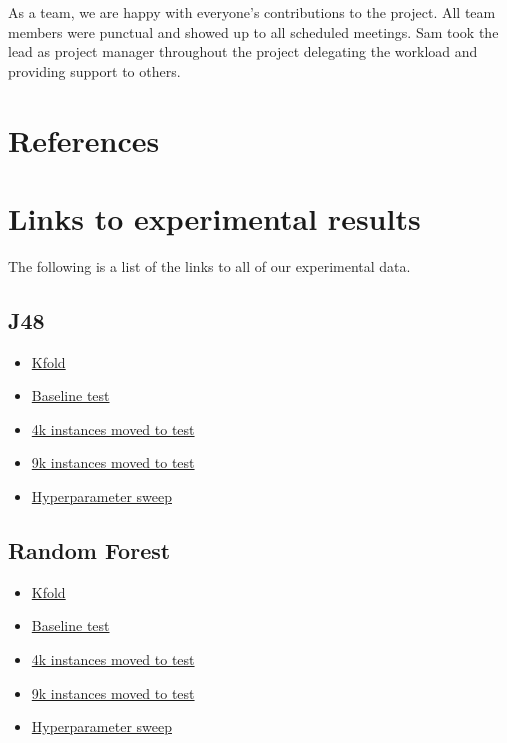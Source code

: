 \documentclass[11pt]{article}
\begin{document}
As a team, we are happy with everyone's contributions to the project. All team members were punctual and showed up to all scheduled meetings. Sam took the lead as project manager throughout the project delegating the workload and providing support to others.

\newpage
\section{References}
\printbibliography

\newpage
\section{Links to experimental results}
The following is a list of the links to all of our experimental data.

\subsection{J48}
\begin{itemize}
  \item \href{https://wandb.ai/supervisedlearning/J48%20all%20Kfolds/?workspace=user-jimmym620}{Kfold}
  \item \href{https://wandb.ai/supervisedlearning/J48%20all%20test%20set%20experiments?workspace=user-dardric}{Baseline test}
  \item \href{https://wandb.ai/supervisedlearning/J48%20all%204000%20moved%20to%20test%20experiments?workspace=user-dardric}{4k instances moved to test}
  \item \href{https://wandb.ai/supervisedlearning/J48%20all%209000%20moved%20to%20test%20experiments?workspace=user-dardric}{9k instances moved to test}
  \item \href{https://wandb.ai/supervisedlearning/J48-sweeps/sweeps/iujbgua2?workspace=user-dardric}{Hyperparameter sweep}
\end{itemize}

\subsection{Random Forest}
\begin{itemize}
  \item \href{https://wandb.ai/supervisedlearning/RF%20all%20Kfolds?workspace=user-jimmym620}{Kfold}
  \item \href{https://wandb.ai/supervisedlearning/RF%20all%20test%20set%20experiments?workspace=user-jimmym620}{Baseline test}
  \item \href{https://wandb.ai/supervisedlearning/RF%20all%204000%20moved%20to%20test%20experiments?workspace=user-jimmym620}{4k instances moved to test}
  \item \href{https://wandb.ai/supervisedlearning/RF%20all%209000%20moved%20to%20test%20experiments?workspace=user-jimmym620}{9k instances moved to test}
  \item \href{https://wandb.ai/supervisedlearning/RF-sweeps/sweeps/eh36kpyc?workspace=user-jimmym620}{Hyperparameter sweep}
\end{itemize}
\end{document}
